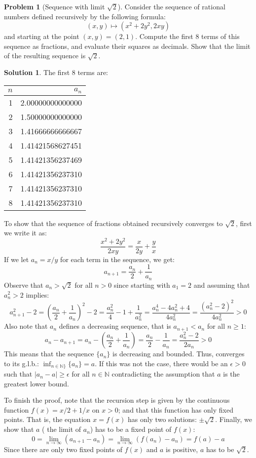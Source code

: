 \documentclass{article}
\theoremstyle{definition}
\newtheorem*{soln}{Solution}
\newtheorem*{prob}{Problem}
\theoremstyle{theorem}
\newcommand{\N}{\mathbb{N}}
\begin{document}
\begin{prob}[Sequence with limit $\sqrt{2}$]
Consider the sequence of rational numbers defined recursively by the following formula: $$(x,y) \mapsto (x^2 + 2y^2, 2xy)$$ and starting at the point $(x,y) = (2,1)$. Compute the first 8 terms of this sequence as fractions, and evaluate their squares as decimals. Show that the limit of the resulting sequence is $\sqrt{2}$.
\end{prob}
\begin{soln}
The first 8 terms are:
	\begin{center}
	\begin{tabular}{|r|r|}
		\hline
		$n$ & $a_n$ \\
		\hline
1& 2.00000000000000\\
		\hline
2& 1.50000000000000\\
		\hline
3& 1.41666666666667\\
		\hline
4& 1.41421568627451\\
		\hline
5& 1.41421356237469\\
		\hline
6& 1.41421356237310\\
		\hline
7& 1.41421356237310\\
		\hline
8& 1.41421356237310\\
\hline
	\end{tabular}
	\end{center}

	To show that the sequence of fractions obtained recursively converges to $\sqrt 2$, first we write it as:
	$$\frac{x^2 + 2y^2}{2xy} = \frac x{2y} + \frac yx $$
	If we let $a_n = x/y$ for each term in the sequence, we get:
	$$a_{n+1} = \frac{a_n}{2} + \frac 1{a_n}$$
	Observe that $a_n > \sqrt 2$ for all $n>0$ since starting with $a_1=2$ and assuming that $a_n^2>2$ implies:
	$$a_{n+1}^2-2 = \left( \frac{a_n}2 + \frac 1{a_n}\right)^2 - 2 = \frac{a_n^2}4 - 1 + \frac 1{a_n^2} = \frac{a_n^4 - 4a_n^2 +4}{4a_n^2} = \frac{(a_n^2-2)^2}{4a_n^2} > 0$$
	Also note that $a_n $ defines a decreasing sequence, that is $a_{n+1} < a_n$ for all $n\geq 1$: 
	$$a_n - a_{n+1} = a_n-\left(\frac{a_n}{2} + \frac 1{a_n}\right)=\frac{a_n}{2} - \frac 1{a_n} = \frac{a_n^2 - 2}{2a_n}>0 $$
	This means that the sequence $\{a_n\}$ is decreasing and bounded. Thus, converges to its g.l.b.: $\inf_{n\in \N\}}\{a_n\} = a$. If this was not the case, there would be an $\epsilon>0$ such that $|a_n - a| \geq \epsilon$ for all $n\in \N$ contradicting the assumption that $a$ is the greatest lower bound.
	
	To finish the proof, note that the recursion step is given by the continuous function $f(x) = x/2 + 1/x$ on $x>0$; and that this function has only fixed points. That is, the equation $x = f(x)$ has only two solutions: $\pm \sqrt 2$. Finally, we show that $a$ ( the limit of $a_n$) has to be a fixed point of $f(x)$:
	$$0 = \lim_{n\to \infty}(a_{n+1} - a_n) = \lim_{n\to \infty}(f(a_n) - a_n) =f(a) - a $$
	Since there are only two fixed points of $f(x)$ and $a$ is positive, $a$ has to be $\sqrt 2$.

\end{soln}
\vspace{1in}
\end{document}

